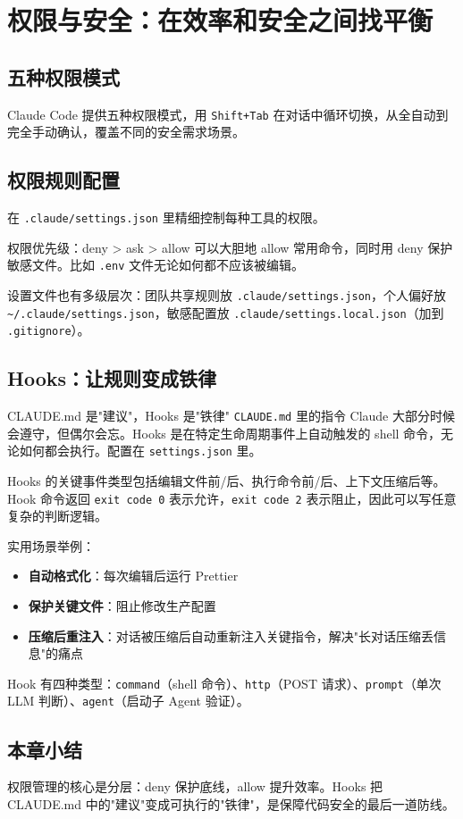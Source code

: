 \section{权限与安全：在效率和安全之间找平衡}

\subsection{五种权限模式}

Claude Code 提供五种权限模式，用 \texttt{Shift+Tab} 在对话中循环切换，从全自动到完全手动确认，覆盖不同的安全需求场景。

\subsection{权限规则配置}

在 \texttt{.claude/settings.json} 里精细控制每种工具的权限。

\begin{importantbox}{权限优先级：deny > ask > allow}
可以大胆地 allow 常用命令，同时用 deny 保护敏感文件。比如 \texttt{.env} 文件无论如何都不应该被编辑。
\end{importantbox}

设置文件也有多级层次：团队共享规则放 \texttt{.claude/settings.json}，个人偏好放 \texttt{\textasciitilde/.claude/settings.json}，敏感配置放 \texttt{.claude/settings.local.json}（加到 \texttt{.gitignore}）。

\subsection{Hooks：让规则变成铁律}

\begin{warningbox}{CLAUDE.md 是"建议"，Hooks 是"铁律"}
\texttt{CLAUDE.md} 里的指令 Claude 大部分时候会遵守，但偶尔会忘。Hooks 是在特定生命周期事件上自动触发的 shell 命令，无论如何都会执行。配置在 \texttt{settings.json} 里。
\end{warningbox}

Hooks 的关键事件类型包括编辑文件前/后、执行命令前/后、上下文压缩后等。Hook 命令返回 \texttt{exit code 0} 表示允许，\texttt{exit code 2} 表示阻止，因此可以写任意复杂的判断逻辑。

实用场景举例：

\begin{itemize}[leftmargin=1.5em]
  \item \textbf{自动格式化}：每次编辑后运行 Prettier
  \item \textbf{保护关键文件}：阻止修改生产配置
  \item \textbf{压缩后重注入}：对话被压缩后自动重新注入关键指令，解决"长对话压缩丢信息"的痛点
\end{itemize}

Hook 有四种类型：\texttt{command}（shell 命令）、\texttt{http}（POST 请求）、\texttt{prompt}（单次 LLM 判断）、\texttt{agent}（启动子 Agent 验证）。

\subsection{本章小结}

权限管理的核心是分层：deny 保护底线，allow 提升效率。Hooks 把 CLAUDE.md 中的"建议"变成可执行的"铁律"，是保障代码安全的最后一道防线。

